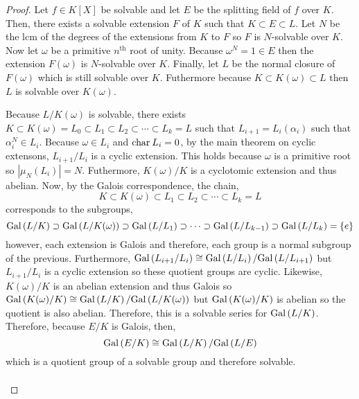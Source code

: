 \documentclass[12pt]{extarticle}
\begin{document}
\begin{proof}
Let $f \in K[X]$ be solvable and let $E$ be the splitting field of $f$ over $K$. Then, there exists a solvable extension $F$ of $K$ such that $K \subset E \subset L$. Let $N$ be the $\mathrm{lcm}$ of the degrees of the extensions from $K$ to $F$ so $F$ is $N$-solvable over $K$. Now let $\omega$ be a primitive $n^{\mathrm{th}}$ root of unity. Because $\omega^N = 1 \in E$ then the extension $F(\omega)$ is $N$-solvable over $K$. Finally, let $L$ be the normal closure of $F(\omega)$ which is still solvable over $K$. Futhermore because $K \subset K(\omega) \subset L$ then $L$ is solvable over $K(\omega)$. 

\begin{center}
\end{center}
Because $L/K(\omega)$ is solvable, there exists $K \subset K(\omega) = L_0 \subset L_1 \subset L_2 \subset \cdots \subset L_k = L$ such that $L_{i + 1} = L_i(\alpha_i)$ such that $\alpha_i^N \in L_i$. Because $\omega \in L_i$ and $\mathrm{char} \: L_i = 0$, by the main theorem on cyclic extensons, $L_{i+1}/L_i$ is a cyclic extension. This holds because $\omega$ is a primitive root so $|\mu_N(L_i)| = N$. Futhermore, $K(\omega)/K$ is a cyclotomic extension and thus abelian. Now, by the Galois correspondence, the chain,
\[K \subset K(\omega) \subset L_1 \subset L_2 \subset \cdots \subset L_k = L\]
corresponds to the subgroups,
\[\mathrm{Gal}\left( L/K \right) \supset \mathrm{Gal}\left( L/K(\omega) \right) \supset \mathrm{Gal}\left( L/L_1 \right) \supset \cdots \supset \mathrm{Gal}\left( L/L_{k-1} \right) \supset \mathrm{Gal}\left( L/L_k \right) = \{e\}\]
however, each extension is Galois and therefore, each group is a normal subgroup of the previous. Furthermore, $\mathrm{Gal}\left( L_{i+1}/L_i \right) \cong \mathrm{Gal}\left( L/L_{i} \right)/\mathrm{Gal}\left( L/L_{i+1} \right)$ but $L_{i+1}/L_i$ is a cyclic extension so these quotient groups are cyclic. Likewise, $K(\omega)/K$ is an abelian extension and thus Galois so $\mathrm{Gal}\left( K(\omega)/K \right) \cong \mathrm{Gal}\left( L/K \right)/\mathrm{Gal}\left( L/K(\omega) \right)$ but $\mathrm{Gal}\left( K(\omega)/K \right)$ is abelian so the quotient is also abelian. Therefore, this is a solvable series for $\mathrm{Gal}\left( L/K \right)$. Therefore, because $E/K$ is Galois, then, 
\[\mathrm{Gal}\left( E/K \right) \cong \mathrm{Gal}\left( L/K \right) /\mathrm{Gal}\left( L/E \right)\] which is a quotient group of a solvable group and therefore solvable. \bigskip \\\\

\end{proof}
\end{document}
